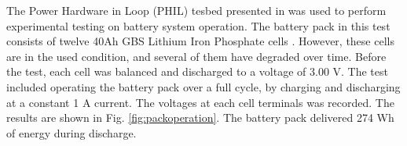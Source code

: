 \documentclass[10pt,twocolumn]{IEEEtran}
\begin{document}
The Power Hardware in Loop (PHIL) tesbed presented in \cite{NAPS_RTDS} was used to perform experimental testing on battery system operation. The battery pack in this test consists of twelve  40Ah GBS Lithium Iron Phosphate cells \cite{elitepower}. However, these cells are in the used condition, and several of them have degraded over time.  Before the test, each cell was balanced and discharged to a voltage of 3.00 V.  The test included operating the battery pack over a full cycle, by charging and discharging at a constant 1 A current.  %
The voltages  at each cell terminals  was  recorded. %
The results are shown in Fig.  \ref{fig:packoperation}.
The battery pack delivered 274 Wh of energy during discharge.






%
\end{document}
